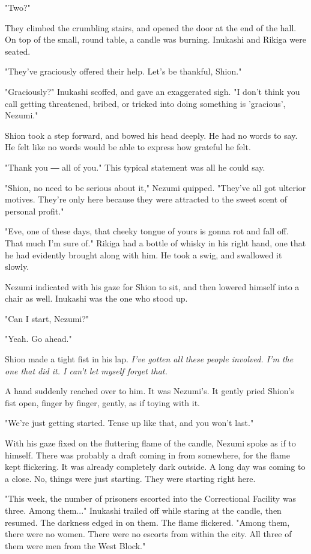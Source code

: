 "Two?"

They climbed the crumbling stairs, and opened the door at the end of the
hall. On top of the small, round table, a candle was burning. Inukashi
and Rikiga were seated.

"They've graciously offered their help. Let's be thankful, Shion."

"Graciously?" Inukashi scoffed, and gave an exaggerated sigh. "I don't
think you call getting threatened, bribed, or tricked into doing
something is 'gracious', Nezumi."

Shion took a step forward, and bowed his head deeply. He had no words to
say. He felt like no words would be able to express how grateful he
felt.

"Thank you ― all of you." This typical statement was all he could say.

"Shion, no need to be serious about it," Nezumi quipped. "They've all
got ulterior motives. They're only here because they were attracted to
the sweet scent of personal profit."

"Eve, one of these days, that cheeky tongue of yours is gonna rot and
fall off. That much I'm sure of." Rikiga had a bottle of whisky in his
right hand, one that he had evidently brought along with him. He took a
swig, and swallowed it slowly.

Nezumi indicated with his gaze for Shion to sit, and then lowered
himself into a chair as well. Inukashi was the one who stood up.

"Can I start, Nezumi?"

"Yeah. Go ahead."

Shion made a tight fist in his lap. \emph{I've gotten all these people
involved. I'm the one that did it. I can't let myself forget that.}

A hand suddenly reached over to him. It was Nezumi's. It gently pried
Shion's fist open, finger by finger, gently, as if toying with it.

"We're just getting started. Tense up like that, and you won't last."

With his gaze fixed on the fluttering flame of the candle, Nezumi spoke
as if to himself. There was probably a draft coming in from somewhere,
for the flame kept flickering. It was already completely dark outside. A
long day was coming to a close. No, things were just starting. They were
starting right here.

"This week, the number of prisoners escorted into the Correctional
Facility was three. Among them..." Inukashi trailed off while staring at
the candle, then resumed. The darkness edged in on them. The flame
flickered. "Among them, there were no women. There were no escorts from
within the city. All three of them were men from the West Block."

